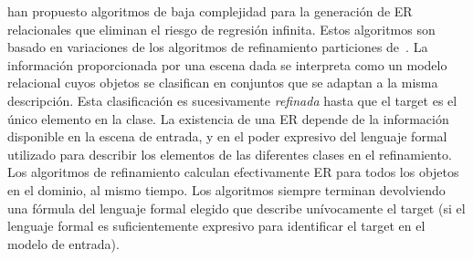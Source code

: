 

\cite{arec2:2008:Areces,arec:usin11} han propuesto algoritmos de baja complejidad
 para la generaci\'on de ER relacionales que eliminan el riesgo de regresi\'on infinita. Estos algoritmos son
basado en variaciones de los algoritmos de refinamiento particiones
de~\cite{paig:thre87}. La informaci\'on proporcionada por una escena dada
se interpreta como un modelo relacional cuyos objetos se clasifican en
conjuntos que se adaptan a la misma descripci\'on. Esta clasificaci\'on es
sucesivamente \emph{refinada} hasta que el target es el \'unico elemento
en la clase. La existencia de una ER depende
de la informaci\'on disponible en la escena de entrada, y en el poder expresivo
del lenguaje formal utilizado para describir los elementos de las
diferentes clases en el refinamiento.\\


Los algoritmos de refinamiento
calculan efectivamente ER para todos los objetos en el dominio, al mismo
tiempo. Los algoritmos siempre terminan devolviendo una f\'ormula del
lenguaje formal elegido que describe un\'{i}vocamente el target (si el
lenguaje formal es suficientemente expresivo para identificar el target en el
modelo de entrada).\\

